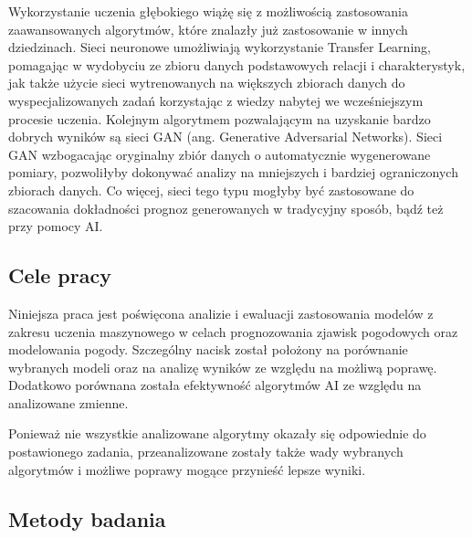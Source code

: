 Wykorzystanie uczenia głębokiego wiążę się z możliwością zastosowania 
zaawansowanych algorytmów, które znalazły już zastosowanie w innych dziedzinach.
Sieci neuronowe umożliwiają wykorzystanie Transfer Learning, pomagając w
wydobyciu ze zbioru danych podstawowych relacji i charakterystyk, jak także
użycie sieci wytrenowanych na większych zbiorach danych do wyspecjalizowanych
zadań korzystając z wiedzy nabytej we wcześniejszym procesie uczenia. Kolejnym 
algorytmem pozwalającym na uzyskanie bardzo dobrych wyników są sieci GAN (ang. 
Generative Adversarial Networks). Sieci GAN wzbogacając oryginalny zbiór danych o
automatycznie wygenerowane pomiary, pozwoliłyby dokonywać analizy na mniejszych i 
bardziej ograniczonych zbiorach danych. Co więcej, sieci tego typu mogłyby
być zastosowane do szacowania dokładności prognoz generowanych w tradycyjny sposób,
bądź też przy pomocy AI.


\subsection{Cele pracy}


Niniejsza praca jest poświęcona analizie i ewaluacji zastosowania modelów 
z zakresu uczenia maszynowego w celach prognozowania zjawisk pogodowych oraz
modelowania pogody. Szczególny nacisk został położony na porównanie wybranych
modeli oraz na analizę wyników ze względu na możliwą poprawę. Dodatkowo 
porównana została efektywność algorytmów AI ze względu na analizowane zmienne.

Ponieważ nie wszystkie analizowane algorytmy okazały się odpowiednie do postawionego
zadania, przeanalizowane zostały także wady wybranych algorytmów i możliwe poprawy
mogące przynieść lepsze wyniki.

\subsection{Metody badania}

